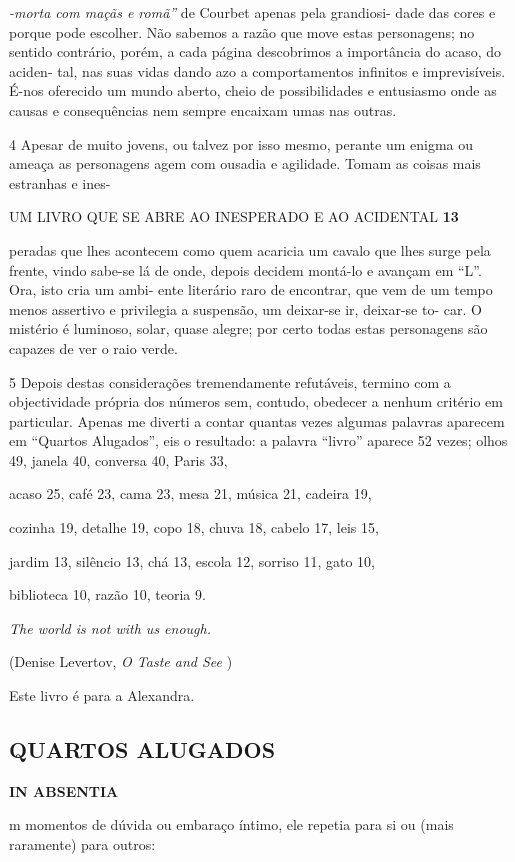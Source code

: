 \emph{-morta com maçãs e romã'' }de Courbet apenas pela grandiosi- dade
das cores e porque pode escolher. Não sabemos a razão que move estas
personagens; no sentido contrário, porém, a cada página descobrimos a
importância do acaso, do aciden- tal, nas suas vidas dando azo a
comportamentos infinitos e imprevisíveis. É-nos oferecido um mundo
aberto, cheio de possibilidades e entusiasmo onde as causas e
consequências nem sempre encaixam umas nas outras.

4 Apesar de muito jovens, ou talvez por isso mesmo, perante um enigma ou
ameaça as personagens agem com ousadia e agilidade. Tomam as coisas mais
estranhas e ines-

UM LIVRO QUE SE ABRE AO INESPERADO E AO ACIDENTAL \textbf{13}

peradas que lhes acontecem como quem acaricia um cavalo que lhes surge
pela frente, vindo sabe-se lá de onde, depois decidem montá-lo e avançam
em ``L''. Ora, isto cria um ambi- ente literário raro de encontrar, que
vem de um tempo menos assertivo e privilegia a suspensão, um deixar-se
ir, deixar-se to- car. O mistério é luminoso, solar, quase alegre; por
certo todas estas personagens são capazes de ver o raio verde.

5 Depois destas considerações tremendamente refutáveis, termino com a
objectividade própria dos números sem, contudo, obedecer a nenhum
critério em particular. Apenas me diverti a contar quantas vezes algumas
palavras aparecem em ``Quartos Alugados'', eis o resultado: a palavra
``livro'' aparece 52 vezes; olhos 49, janela 40, conversa 40, Paris 33,

acaso 25, café 23, cama 23, mesa 21, música 21, cadeira 19,

cozinha 19, detalhe 19, copo 18, chuva 18, cabelo 17, leis 15,

jardim 13, silêncio 13, chá 13, escola 12, sorriso 11, gato 10,

biblioteca 10, razão 10, teoria 9.

\emph{The world is not with us enough.}

(Denise Levertov, \emph{O Taste and See })

Este livro é para a Alexandra.


\subsection{QUARTOS ALUGADOS}

\textbf{IN ABSENTIA}

m momentos de dúvida ou embaraço íntimo, ele repetia para si ou (mais
raramente) para outros:

